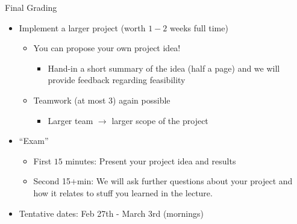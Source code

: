 \documentclass[aspectratio=169]{../latex_main/tntbeamer}  %
\begin{document}
\begin{frame}[c]{Final Grading}
	
	\begin{itemize}
		\item Implement a larger project (worth $1-2$ weeks full time)
		\begin{itemize}
			\item You can propose your own project idea!
			\begin{itemize}
				\item Hand-in a short summary of the idea (half a page) and we will provide feedback regarding feasibility
			\end{itemize}
			\item Teamwork (at most 3) again possible
			\begin{itemize}
				\item Larger team $\to$ larger scope of the project
			\end{itemize}
		\end{itemize}
		\item ``Exam''
		\begin{itemize}
			\item First $15$ minutes: Present your project idea and results
			\item Second 15+min: We will ask further questions about your project and how it relates to stuff you learned in the lecture.
		\end{itemize}	
            \item \alert{Tentative dates}: Feb 27th - March 3rd (mornings)
	\end{itemize}
	
\end{frame}
\end{document}
